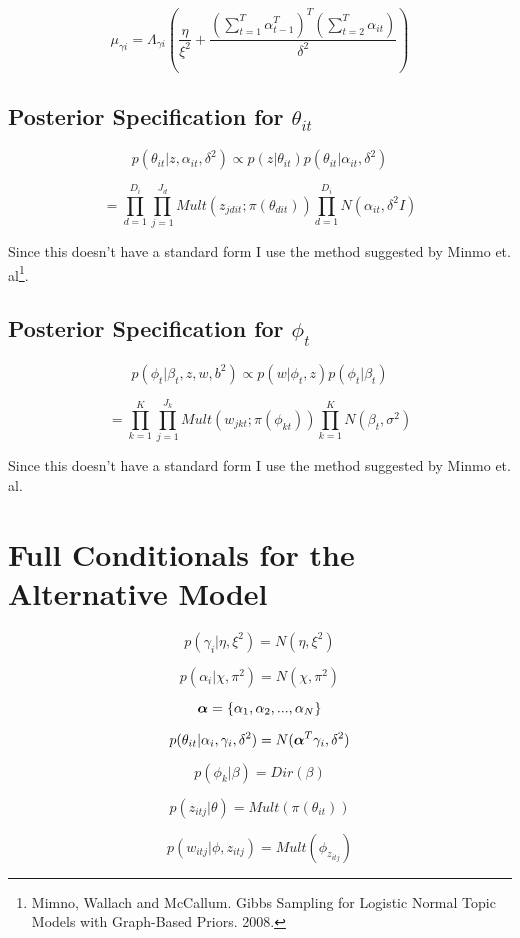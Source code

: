 \documentclass[a4paper]{article}
\begin{document}
\[\mu_{\gamma i} = \Lambda_{\gamma i} \left(\frac{\eta}{\xi^2} + \frac{\left(\sum_{t=1}^T \alpha_{t-1}^T\right)^T \left(\sum_{t=2}^T \alpha_{it}\right)}{\delta^2}\right)\]

\subsection{Posterior Specification for $\theta_{it}$}

\[p(\theta_{it} | z, \alpha_{it}, \delta^2) \propto p(z | \theta_{it}) p(\theta_{it} | \alpha_{it}, \delta^2)\]

\[= \prod_{d=1}^{D_i} \prod_{j=1}^{J_d} Mult(z_{jdit}; \pi(\theta_{dit}))\prod_{d=1}^{D_i} N(\alpha_{it}, \delta^2I)\]

Since this doesn't have a standard form I use the method suggested by Minmo et. al\footnote{Mimno, Wallach and McCallum. Gibbs Sampling for Logistic Normal Topic Models with Graph-Based Priors. 2008.}.

\subsection{Posterior Specification for $\phi_t$}

\[p(\phi_t | \beta_t, z, w, b^2) \propto p(w | \phi_t, z) p(\phi_t | \beta_t)\]

\[= \prod_{k=1}^K \prod_{j=1}^{J_k} Mult(w_{jkt}; \pi(\phi_{kt}))\prod_{k=1}^K N(\beta_t, \sigma^2)\]

Since this doesn't have a standard form I use the method suggested by Minmo et. al.

\section{Full Conditionals for the Alternative Model}

\[p(\gamma_i | \eta, \xi^2) = N(\eta, \xi^2)\]

\[p(\alpha_i|\chi,\pi^2) = N(\chi, \pi^2)\]

\[\text{\boldmath$\alpha$} = \{\alpha_1, \alpha_2, ...,\alpha_N\}\]

\[p(\theta_{it}| \alpha_i, \gamma_i,\delta^2) = N(\text{\boldmath$\alpha$}^T \gamma_i, \delta^2)\]

\[p(\phi_k | \beta) = Dir(\beta)\]

\[p(z_{itj}| \theta) = Mult(\pi(\theta_{it}))\]

\[p(w_{itj} | \phi, z_{itj}) = Mult(\phi_{z_{itj}})\]
\end{document}
